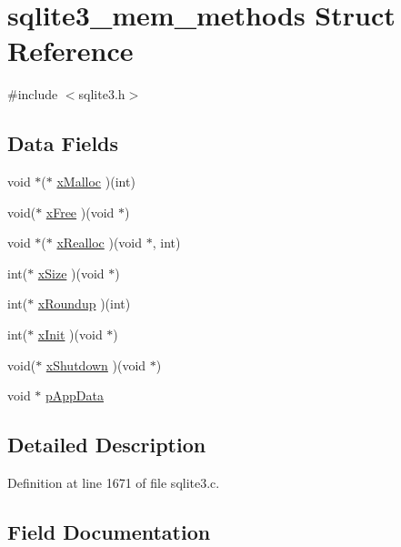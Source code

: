 \hypertarget{structsqlite3__mem__methods}{}\section{sqlite3\+\_\+mem\+\_\+methods Struct Reference}
\label{structsqlite3__mem__methods}


{\ttfamily \#include $<$sqlite3.\+h$>$}

\subsection*{Data Fields}
\begin{DoxyCompactItemize}
\item 
void $\ast$($\ast$ \hyperlink{structsqlite3__mem__methods_a7eb33731499ee82125a79071c9df4cc7}{x\+Malloc} )(int)
\item 
void($\ast$ \hyperlink{structsqlite3__mem__methods_a91abab31fe16927c08291ab9b332bf8f}{x\+Free} )(void $\ast$)
\item 
void $\ast$($\ast$ \hyperlink{structsqlite3__mem__methods_a10a9a571a4b40370c8f684e3dfbd9aed}{x\+Realloc} )(void $\ast$, int)
\item 
int($\ast$ \hyperlink{structsqlite3__mem__methods_a37f680cda62590be32b36d962b6ce009}{x\+Size} )(void $\ast$)
\item 
int($\ast$ \hyperlink{structsqlite3__mem__methods_a02b48fb7c072d77a055859d16cd94077}{x\+Roundup} )(int)
\item 
int($\ast$ \hyperlink{structsqlite3__mem__methods_a707c4748dcafc75384a806d13bb68bdd}{x\+Init} )(void $\ast$)
\item 
void($\ast$ \hyperlink{structsqlite3__mem__methods_a34a88425495f42099aadbe3fa9676a06}{x\+Shutdown} )(void $\ast$)
\item 
void $\ast$ \hyperlink{structsqlite3__mem__methods_a2edf2e7445f2f46196126195c7710f75}{p\+App\+Data}
\end{DoxyCompactItemize}


\subsection{Detailed Description}


Definition at line 1671 of file sqlite3.\+c.



\subsection{Field Documentation}
\hypertarget{structsqlite3__mem__methods_a2edf2e7445f2f46196126195c7710f75}{}

